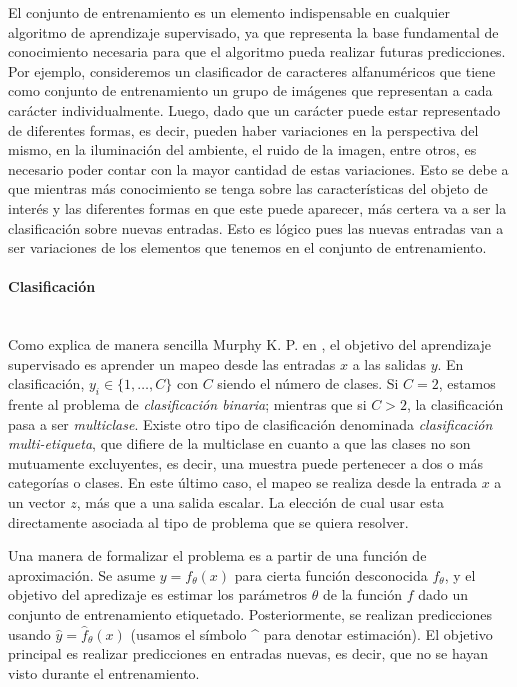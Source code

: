 	El conjunto de entrenamiento es un elemento indispensable en cualquier algoritmo de aprendizaje supervisado, ya que representa la base fundamental de conocimiento necesaria para que el algoritmo pueda realizar futuras predicciones. Por ejemplo, consideremos un clasificador de caracteres alfanuméricos que tiene como conjunto de entrenamiento un grupo de imágenes que representan a cada carácter individualmente. Luego, dado que un carácter puede estar representado de diferentes formas, es decir, pueden haber variaciones en la perspectiva del mismo, en la iluminación del ambiente, el ruido de la imagen, entre otros, es necesario poder contar con la mayor cantidad de estas variaciones. Esto se debe a que mientras más conocimiento se tenga sobre las características del objeto de interés y las diferentes formas en que este puede aparecer, más certera va a ser la clasificación sobre nuevas entradas. Esto es lógico pues las nuevas entradas van a ser variaciones de los elementos que tenemos en el conjunto de entrenamiento.
	
	
	\paragraph{Clasificación}  ~\\
	
		Como explica de manera sencilla Murphy K. P. en \cite{Murphy12}, el objetivo del aprendizaje supervisado es aprender un mapeo desde las entradas $x$ a las salidas $y$. En clasificación, $y_i \in \{1,\dots,C\}$ con $C$ siendo el número de clases. Si $C=2$, estamos frente al problema de \textit{clasificación binaria}; mientras que si $C>2$, la clasificación pasa a ser \textit{multiclase}. Existe otro tipo de clasificación denominada \textit{clasificación multi-etiqueta}, que difiere de la multiclase en cuanto a que las clases no son mutuamente excluyentes, es decir, una muestra puede pertenecer a dos o más categorías o clases. En este último caso, el mapeo se realiza desde la entrada $x$ a un vector $z$, más que a una salida escalar. La elección de cual usar esta directamente asociada al tipo de problema que se quiera resolver.
		
		Una manera de formalizar el problema es a partir de una función de aproximación. Se asume $y = f_{\theta}(x)$ para cierta función desconocida $f_{\theta}$, y el objetivo del apredizaje es estimar los parámetros $\theta$ de la función $f$ dado un conjunto de entrenamiento etiquetado. Posteriormente, se realizan predicciones usando $\hat{y} = \hat{f}_{\theta}(x)$ (usamos el símbolo \string^ para denotar estimación). El objetivo principal es realizar predicciones en entradas nuevas, es decir, que no se hayan visto durante el entrenamiento.
		

